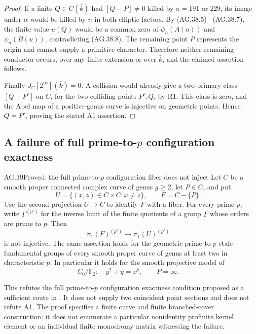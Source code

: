 \begin{proof}
If a finite \(Q\in C(\bar k)\) had \([Q-P]\ne0\) killed
by \(n=191\) or \(229\), its image under \(\alpha\) would
be killed by \(n\) in both elliptic factors. By (AG.38.5)--
(AG.38.7), the finite value \(u(Q)\) would be a common zero of
\(\psi_n(A(u))\) and \(\psi_n(B(u))\), contradicting
(AG.38.8). The remaining point \(P\) represents the origin
and cannot supply a primitive character. Therefore neither
remaining conductor occurs, over any finite extension or over
\(\bar k\), and the claimed assertion follows.

Finally \(J_C[2^\infty](\bar k)=0\). A collision would already
give a two-primary class \([Q-P']\) on \(C\), for the two
colliding points \(P',Q\), by R1. This class is zero, and the
Abel map of a positive-genus curve is injective on geometric
points. Hence \(Q=P'\), proving the stated A1 assertion.
\end{proof}

\subsection{A failure of full prime-to-\texorpdfstring{\(p\)}{p} configuration exactness}

\begin{claim}{AG.39}{Proved: the full prime-to-\(p\) configuration fiber does not inject}
\label{clm:AGconfigurationodd}
Let \(C\) be a smooth proper connected complex curve of genus
\(g\geq2\), let \(P\in C\), and put
\[
 U=\{(x,z)\in C\times C:x\ne z\},\qquad F=C-\{P\}.
\]
Use the second projection \(U\to C\) to identify \(F\) with a
fiber. For every prime \(p\), write \(\Gamma^{(p')}\) for the
inverse limit of the finite quotients of a group \(\Gamma\)
whose orders are prime to \(p\). Then
\[
 \pi_1(F)^{(p')}\longrightarrow
 \pi_1(U)^{(p')}                                     \tag{AG.39.1}
\]
is not injective. The same assertion holds for the geometric
prime-to-\(p\) etale fundamental groups of every smooth proper
curve of genus at least two in characteristic \(p\).
In particular it holds for the smooth projective model of
\[
                    C_0/\mathbb F_2:\quad y^2+y=x^5,
             \qquad P=\infty.                       \tag{AG.39.2}
\]

This refutes the full prime-to-\(p\) configuration exactness
condition proposed as a sufficient route in
\cite[Remark 3.13]{AR_ST2009}. It does not supply two coincident
point sections and does not refute A1. The proof specifies a finite
curve and finite branched-cover construction; it does not enumerate
a particular nonidentity profinite kernel element or an individual
finite monodromy matrix witnessing the failure.
\end{claim}

